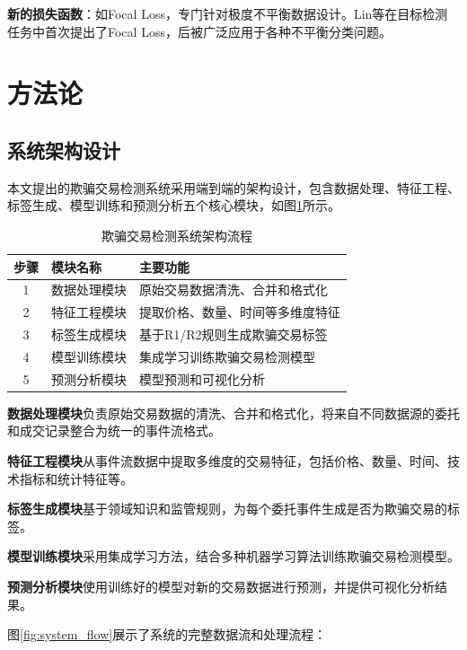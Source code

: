 \documentclass[12pt,a4paper]{article}
\begin{document}
\textbf{新的损失函数}：如Focal Loss，专门针对极度不平衡数据设计。Lin等\cite{lin2017focal}在目标检测任务中首次提出了Focal Loss，后被广泛应用于各种不平衡分类问题。

\section{方法论}

\subsection{系统架构设计}

本文提出的欺骗交易检测系统采用端到端的架构设计，包含数据处理、特征工程、标签生成、模型训练和预测分析五个核心模块，如图\ref{fig:system_architecture}所示。

\begin{table}[H]
\centering
\caption{欺骗交易检测系统架构流程}
\label{fig:system_architecture}
\begin{tabular}{cll}
\toprule
步骤 & 模块名称 & 主要功能 \\
\midrule
1 & 数据处理模块 & 原始交易数据清洗、合并和格式化 \\
2 & 特征工程模块 & 提取价格、数量、时间等多维度特征 \\
3 & 标签生成模块 & 基于R1/R2规则生成欺骗交易标签 \\
4 & 模型训练模块 & 集成学习训练欺骗交易检测模型 \\
5 & 预测分析模块 & 模型预测和可视化分析 \\
\bottomrule
\end{tabular}
\end{table}

\textbf{数据处理模块}负责原始交易数据的清洗、合并和格式化，将来自不同数据源的委托和成交记录整合为统一的事件流格式。

\textbf{特征工程模块}从事件流数据中提取多维度的交易特征，包括价格、数量、时间、技术指标和统计特征等。

\textbf{标签生成模块}基于领域知识和监管规则，为每个委托事件生成是否为欺骗交易的标签。

\textbf{模型训练模块}采用集成学习方法，结合多种机器学习算法训练欺骗交易检测模型。

\textbf{预测分析模块}使用训练好的模型对新的交易数据进行预测，并提供可视化分析结果。

图\ref{fig:system_flow}展示了系统的完整数据流和处理流程：
\end{document}
